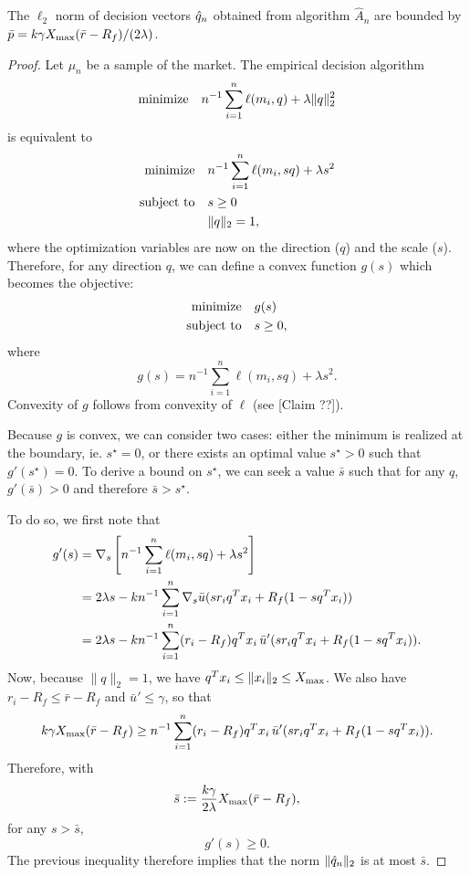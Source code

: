 \begin{claim}
  \label{claim_p_bound}
  The $\ell_2$ norm of decision vectors ${\hat q}_n$ obtained from algorithm $\hat A_n$ are
  bounded by $\bar p = k\gamma X_{\max}(\bar r-R_f)/(2\lambda)$.
\end{claim}
\begin{proof}
  Let $\mu_n$ be a sample of the market. The empirical decision algorithm 
  \begin{equation*}
    \text{minimize} \quad {n^{-1}\sum_{i=1}^n\ell(m_i,q) + \lambda\|q\|^2_2}
  \end{equation*}
  is equivalent to 
  \begin{align*}
    \minimizeEquationSt{n^{-1}\sum_{i=1}^n \ell(m_i,sq) + \lambda s^2}[s\geq0\\,\|q\|_2=1],
  \end{align*}
  where the optimization variables are now on the direction ($q$) and the scale
  ($s$). Therefore, for any direction $q$, we can define a convex function $g(s)$ which
  becomes the objective:
  \begin{align*}
    \minimizeEquationSt{g(s)}[s\geq 0],
  \end{align*}
  where
  \begin{equation*}
    g(s) = n^{-1}\sum_{i=1}^n \ell(m_i, sq) + \lambda s^2.
  \end{equation*}
  Convexity of $g$ follows from convexity of $\ell$ (see [Claim ??]).

  
  Because $g$ is convex, we can consider two cases: either the minimum is realized at the
  boundary, ie. $s^\star=0$, or there exists an optimal value $s^\star > 0$ such that
  $g'(s^\star)=0$. To derive a bound on $s^\star$, we can seek a value $\bar s$ such
  that for any $q$, $g'(\bar s)>0$ and therefore $\bar s > s^\star$.

  To do so, we first note that 
  \begin{align*}
    g'(s) &= \nabla_s \left[n^{-1}\sum_{i=1}^n\ell(m_i,sq) + \lambda s^2\right]\\
          &= 2\lambda s - kn^{-1}\sum_{i=1}^n \nabla_s \bar u(sr_iq^Tx_i+R_f(1-sq^Tx_i))\\
          &= 2\lambda s - kn^{-1}\sum_{i=1}^n (r_i-R_f)q^Tx_i \, \bar u'(sr_iq^Tx_i+R_f(1-sq^Tx_i)).
  \end{align*}
  Now, because $\|q\|_2=1$, we have $q^Tx_i\leq\|x_i\|_2\leq X_{\max}$. We also have
  $r_i-R_f\leq \bar r-R_f$ and $\bar u'\leq\gamma$, so that
  \begin{equation*}
    k\gamma X_{\max}(\bar r-R_f) \geq n^{-1}\sum_{i=1}^n (r_i-R_f)q^Tx_i \, \bar u'(sr_iq^Tx_i+R_f(1-sq^Tx_i)).
  \end{equation*}
  Therefore, with
  \begin{equation*}
    \bar s := \frac{k\gamma}{2\lambda}X_{\max}(\bar r-R_f),
  \end{equation*}
  for any $s>\bar s$,
  \begin{equation*}
    g'(s) \geq 0.
  \end{equation*}
  The previous inequality therefore implies that the norm $\|{\hat q}_n\|_2$ is at most $\bar
  s$. 
\end{proof}


